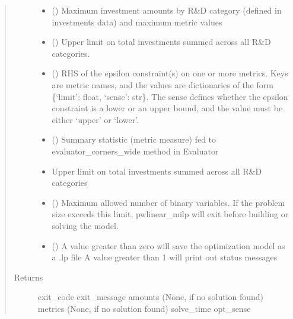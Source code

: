 \documentclass[letterpaper,10pt,english]{sphinxmanual}
\begin{document}
\begin{fulllineitems}
\begin{fulllineitems}
\begin{quote}
\begin{description}
\begin{itemize}
\item {} 
 () \textendash{} Maximum investment amounts by R\&D category (defined in investments data)
and maximum metric values

\item {} 
 () \textendash{} Upper limit on total investments summed across all R\&D categories.

\item {} 
 () \textendash{} RHS of the epsilon constraint(s) on one or more metrics. Keys are metric
names, and the values are dictionaries of the form
\{‘limit’: float, ‘sense’: str\}. The sense defines whether the epsilon
constraint is a lower or an upper bound, and the value must be either
‘upper’ or ‘lower’.

\item {} 
 () \textendash{} Summary statistic (metric measure) fed to evaluator\_corners\_wide method
in Evaluator

\item {} 
 \textendash{} Upper limit on total investments summed across all R\&D categories

\item {} 
 () \textendash{} Maximum allowed number of binary variables. If the problem size exceeds
this limit, pwlinear\_milp will exit before building or solving the model.

\item {} 
 () \textendash{} A value greater than zero will save the optimization model as a .lp file
A value greater than 1 will print out status messages

\end{itemize}

\item[{Returns}] \leavevmode
{} \textendash{} exit\_code
exit\_message
amounts (None, if no solution found)
metrics (None, if no solution found)
solve\_time
opt\_sense


\end{description}
\end{quote}
\end{fulllineitems}
\end{fulllineitems}
\end{document}
